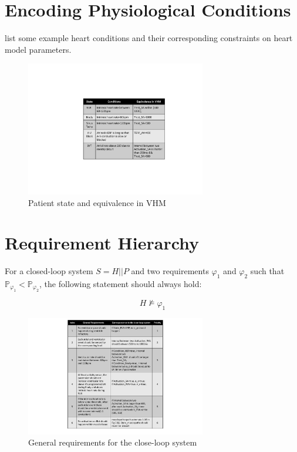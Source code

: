 \section{Encoding Physiological Conditions}
 list some example heart conditions and their corresponding constraints on heart model parameters.
\begin{figure}[!t]
	\center
	\includegraphics[width=0.70\textwidth]{figs/state.pdf}
	\center
	
	\caption{Patient state and equivalence in VHM}
	\label{fig:state}
\end{figure}

\section{Requirement Hierarchy}
For a closed-loop system $S=H || P$ and two requirements $\varphi_1$ and $\varphi_2$ such that $\mathbb{P}_{\varphi_1}<\mathbb{P}_{\varphi_2}$, the following statement should always hold:

$$H\not\models\varphi_1$$
\begin{figure}[!t]
	\center
	\includegraphics[width=0.7\textwidth]{figs/properties.pdf}
	\center
	\caption{General requirements for the close-loop system}
	\label{fig:properties}
\end{figure}

